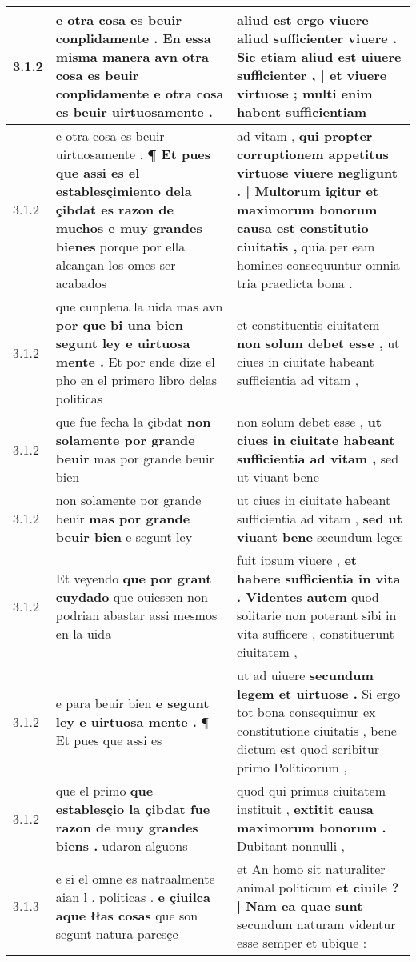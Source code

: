 \begin{tabular}{|p{1cm}|p{6.5cm}|p{6.5cm}|}
3.1.2 & e otra cosa es beuir conplidamente . \textbf{ En essa misma manera avn otra cosa es beuir conplidamente } e otra cosa es beuir uirtuosamente . & aliud est ergo viuere aliud sufficienter viuere . \textbf{ Sic etiam aliud est uiuere sufficienter , | et viuere virtuose ; } multi enim habent sufficientiam \\\hline
3.1.2 & e otra cosa es beuir uirtuosamente . \textbf{ ¶ Et pues que assi es el establesçimiento dela çibdat es razon de muchos e muy grandes bienes } porque por ella alcançan los omes ser acabados & ad vitam , \textbf{ qui propter corruptionem appetitus virtuose viuere negligunt . | Multorum igitur et maximorum bonorum causa est constitutio ciuitatis , } quia per eam homines consequuntur omnia tria praedicta bona . \\\hline
3.1.2 & que cunplena la uida mas avn \textbf{ por que bi una bien segunt ley e uirtuosa mente . } Et por ende dize el pho en el primero libro delas politicas & et constituentis ciuitatem \textbf{ non solum debet esse , } ut ciues in ciuitate habeant sufficientia ad vitam , \\\hline
3.1.2 & que fue fecha la çibdat \textbf{ non solamente por grande beuir } mas por grande beuir bien & non solum debet esse , \textbf{ ut ciues in ciuitate habeant sufficientia ad vitam , } sed ut viuant bene \\\hline
3.1.2 & non solamente por grande beuir \textbf{ mas por grande beuir bien } e segunt ley & ut ciues in ciuitate habeant sufficientia ad vitam , \textbf{ sed ut viuant bene } secundum leges \\\hline
3.1.2 & Et veyendo \textbf{ que por grant cuydado } que ouiessen non podrian abastar assi mesmos en la uida & fuit ipsum viuere , \textbf{ et habere sufficientia in vita . Videntes autem } quod solitarie non poterant sibi in vita sufficere , constituerunt ciuitatem , \\\hline
3.1.2 & e para beuir bien \textbf{ e segunt ley e uirtuosa mente . } ¶ Et pues que assi es & ut ad uiuere \textbf{ secundum legem et uirtuose . } Si ergo tot bona consequimur ex constitutione ciuitatis , bene dictum est quod scribitur primo Politicorum , \\\hline
3.1.2 & que el primo \textbf{ que establesçio la çibdat fue razon de muy grandes biens . } udaron alguons & quod qui primus ciuitatem instituit , \textbf{ extitit causa maximorum bonorum . } Dubitant nonnulli , \\\hline
3.1.3 & e si el omne es natraalmente aian l . politicas . \textbf{ e çiuilca aque łłas cosas } que son segunt natura paresçe & et An homo sit naturaliter animal politicum \textbf{ et ciuile ? | Nam ea quae sunt } secundum naturam videntur esse semper et ubique : \\\hline

\end{tabular}
